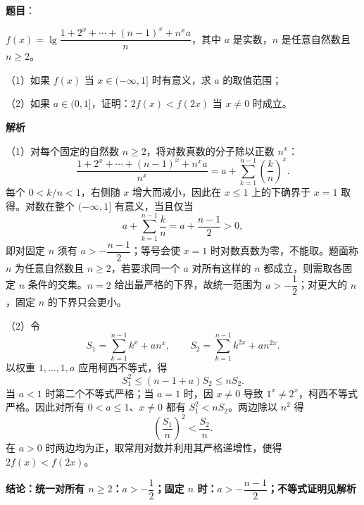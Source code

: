 \begin{answer}

\textbf{题目}：

$f(x)=\lg\dfrac{1+2^x+\cdots+(n-1)^x+n^x a}{n}$，其中 $a$ 是实数，$n$ 是任意自然数且 $n\ge2$。

（1）如果 $f(x)$ 当 $x\in(-\infty,1]$ 时有意义，求 $a$ 的取值范围；

（2）如果 $a\in(0,1]$，证明：$2f(x)<f(2x)$ 当 $x\ne0$ 时成立。

\textbf{解析}

（1）对每个固定的自然数 $n\ge2$，将对数真数的分子除以正数 $n^x$：
\nopagebreak[4]
\[
\frac{1+2^x+\cdots+(n-1)^x+n^x a}{n^x}
=a+\sum_{k=1}^{n-1}\left(\frac{k}{n}\right)^x.
\]
每个 $0<k/n<1$，右侧随 $x$ 增大而减小，因此在 $x\le1$ 上的下确界于 $x=1$ 取得。对数在整个 $(-\infty,1]$ 有意义，当且仅当
\nopagebreak[4]
\[
a+\sum_{k=1}^{n-1}\frac{k}{n}
=a+\frac{n-1}{2}>0,
\]
即对固定 $n$ 须有 $a> -\dfrac{n-1}{2}$；等号会使 $x=1$ 时对数真数为零，不能取。题面称 $n$ 为任意自然数且 $n\ge2$，若要求同一个 $a$ 对所有这样的 $n$ 都成立，则需取各固定 $n$ 条件的交集。$n=2$ 给出最严格的下界，故统一范围为 $a> -\dfrac12$；对更大的 $n$，固定 $n$ 的下界只会更小。

（2）令
\nopagebreak[4]
\[
S_1=\sum_{k=1}^{n-1}k^x+a n^x,
\qquad
S_2=\sum_{k=1}^{n-1}k^{2x}+a n^{2x}.
\]
以权重 $1,\ldots,1,a$ 应用柯西不等式，得
\nopagebreak[4]
\[
S_1^2\le(n-1+a)S_2\le nS_2.
\]
当 $a<1$ 时第二个不等式严格；当 $a=1$ 时，因 $x\ne0$ 导致 $1^x\ne2^x$，柯西不等式严格。因此对所有 $0<a\le1$、$x\ne0$ 都有 $S_1^2<nS_2$。两边除以 $n^2$ 得
\nopagebreak[4]
\[
\left(\frac{S_1}{n}\right)^2<\frac{S_2}{n}.
\]
在 $a>0$ 时两边均为正，取常用对数并利用其严格递增性，便得 $2f(x)<f(2x)$。

\textbf{结论：统一对所有 $n\ge2$：$a>-\dfrac12$；固定 $n$ 时：$a>-\dfrac{n-1}{2}$；不等式证明见解析}


\end{answer}